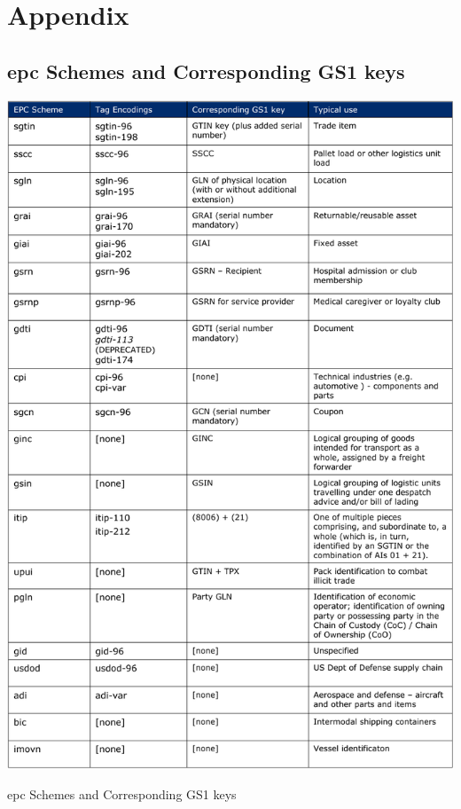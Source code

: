 \renewcommand{\thesection}{\Alph{section}}
\chapter{Appendix} 
\begin{appendices}
\section{\ac{epc} Schemes and Corresponding GS1 keys} \label{anx:epccodingschemes}
\begin{table}
    \centering
    \includegraphics[width=\textwidth]{./figs/02-state-of-the-art/epcschemes.pdf}
    \caption{\ac{epc} Schemes and Corresponding GS1 keys~\cite{GS1EPCTDS}} 
    \label{tab:epcschemes}
\end{table}


\end{appendices}
